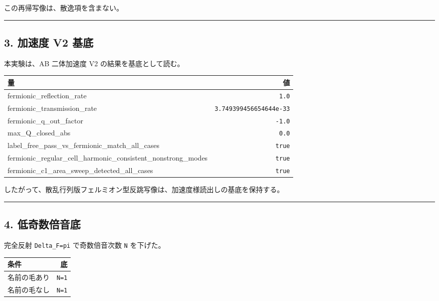 \documentclass[
  xelatex,
  ja=standard]{bxjsarticle}
\newcounter{none} %
\begin{document}
この再帰写像は、散逸項を含まない。

\begin{center}\rule{0.5\linewidth}{0.5pt}\end{center}

\subsection{3. 加速度 V2 基底}\label{ux52a0ux901fux5ea6-v2-ux57faux5e95}

本実験は、AB 二体加速度 V2 の結果を基底として読む。

{\def\LTcaptype{none} %
\begin{longtable}[]{@{}lr@{}}
\toprule\noalign{}
量 & 値 \\
\midrule\noalign{}
\endhead
\bottomrule\noalign{}
\endlastfoot
fermionic\_reflection\_rate & \texttt{1.0} \\
fermionic\_transmission\_rate & \texttt{3.749399456654644e-33} \\
fermionic\_q\_out\_factor & \texttt{-1.0} \\
max\_Q\_closed\_abs & \texttt{0.0} \\
label\_free\_pass\_vs\_fermionic\_match\_all\_cases & \texttt{true} \\
fermionic\_regular\_cell\_harmonic\_consistent\_nonstrong\_modes &
\texttt{true} \\
fermionic\_c1\_area\_sweep\_detected\_all\_cases & \texttt{true} \\
\end{longtable}
}

したがって、散乱行列版フェルミオン型反跳写像は、加速度様読出しの基底を保持する。

\begin{center}\rule{0.5\linewidth}{0.5pt}\end{center}

\subsection{4. 低奇数倍音底}\label{ux4f4eux5947ux6570ux500dux97f3ux5e95}

完全反射 \texttt{Delta\_F=pi} で奇数倍音次数 \texttt{N} を下げた。

{\def\LTcaptype{none} %
\begin{longtable}[]{@{}lr@{}}
\toprule\noalign{}
条件 & 底 \\
\midrule\noalign{}
\endhead
\bottomrule\noalign{}
\endlastfoot
名前の毛あり & \texttt{N=1} \\
名前の毛なし & \texttt{N=1} \\
\end{longtable}
}
\end{document}
